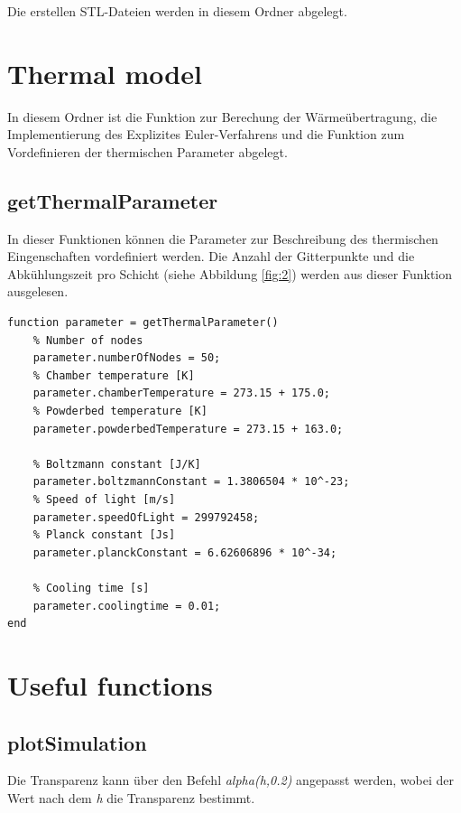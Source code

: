 \documentclass{scrartcl}
\begin{document}
Die erstellen STL-Dateien werden in diesem Ordner abgelegt.

\section{Thermal model}\label{sec:thermalModel}

In diesem Ordner ist die Funktion zur Berechung der Wärmeübertragung, die Implementierung des Explizites Euler-Verfahrens und die Funktion zum Vordefinieren der thermischen Parameter abgelegt.

\subsection{getThermalParameter}\label{subsec:getThermalParameter}

In dieser Funktionen können die Parameter zur Beschreibung des thermischen Eingenschaften vordefiniert werden. Die Anzahl der Gitterpunkte und die Abkühlungszeit pro Schicht (siehe Abbildung \ref{fig:2}) werden aus dieser Funktion ausgelesen. 

\begin{lstlisting}
function parameter = getThermalParameter()
    % Number of nodes
    parameter.numberOfNodes = 50;
    % Chamber temperature [K]
    parameter.chamberTemperature = 273.15 + 175.0;
    % Powderbed temperature [K]
    parameter.powderbedTemperature = 273.15 + 163.0;
    
    % Boltzmann constant [J/K]
    parameter.boltzmannConstant = 1.3806504 * 10^-23;
    % Speed of light [m/s]
    parameter.speedOfLight = 299792458;
    % Planck constant [Js]
    parameter.planckConstant = 6.62606896 * 10^-34;
    
    % Cooling time [s]
    parameter.coolingtime = 0.01;
end
\end{lstlisting}

\section{Useful functions}\label{sec:usefulFunctions}

\subsection{plotSimulation}\label{subsec:plotSimulation}

Die Transparenz kann über den Befehl \textit{alpha(h,0.2)} angepasst werden, wobei der Wert nach dem \textit{h} die Transparenz bestimmt.
\end{document}
